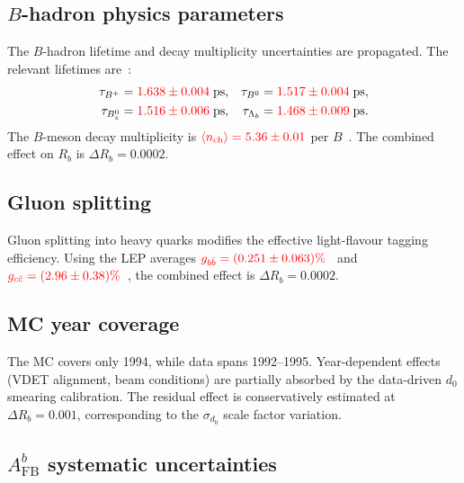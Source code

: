 \documentclass[11pt,a4paper]{article}
\newcommand{\external}[1]{\textcolor{red}{#1}}
\begin{document}
\subsection{$B$-hadron physics parameters}
\label{sec:syst-physics}

The $B$-hadron lifetime and decay multiplicity uncertainties are
propagated.  The relevant lifetimes are~\cite{PDG:2024}:
\begin{align*}
\tau_{B^+}       &= \external{1.638 \pm 0.004}\;\text{ps}, &
\tau_{B^0}       &= \external{1.517 \pm 0.004}\;\text{ps}, \\
\tau_{B_s^0}     &= \external{1.516 \pm 0.006}\;\text{ps}, &
\tau_{\Lambda_b} &= \external{1.468 \pm 0.009}\;\text{ps}.
\end{align*}
The $B$-meson decay multiplicity is
$\external{\langle n_\text{ch}\rangle = 5.36 \pm 0.01}$
per $B$~\cite{PDG:2024}.
The combined effect on $R_b$ is $\Delta R_b = 0.0002$.

\subsection{Gluon splitting}
\label{sec:syst-gluon}

Gluon splitting into heavy quarks modifies the effective
light-flavour tagging efficiency.
Using the LEP averages
$\external{g_{b\bar{b}} = (0.251 \pm 0.063)\%}$~\cite{ALEPH:gbb}
and $\external{g_{c\bar{c}} = (2.96 \pm 0.38)\%}$~\cite{LEP:gcc},
the combined effect is $\Delta R_b = 0.0002$.

\subsection{MC year coverage}
\label{sec:syst-mc-coverage}

The MC covers only 1994, while data spans 1992--1995.
Year-dependent effects (VDET alignment, beam conditions) are
partially absorbed by the data-driven $d_0$ smearing calibration.
The residual effect is conservatively estimated at
$\Delta R_b = 0.001$, corresponding to the $\sigma_{d_0}$
scale factor variation.

\subsection{$A_\text{FB}^b$ systematic uncertainties}
\label{sec:syst-afb}
\end{document}
